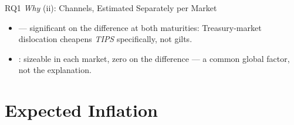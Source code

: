 \begin{frame}[t]{RQ1 \emph{Why} (ii): Channels, Estimated Separately per Market}
\vspace{0.15cm}
\raggedright\footnotesize
\begin{itemize}\itemsep=0.05cm\footnotesize
  \item {} --- significant on the
        difference at both maturities: Treasury-market dislocation cheapens \emph{TIPS}
        specifically, not gilts.
  \item {}: sizeable in each market, zero
        on the difference --- a common global factor, not the explanation.
\end{itemize}
\end{frame}

\section{Expected Inflation}

